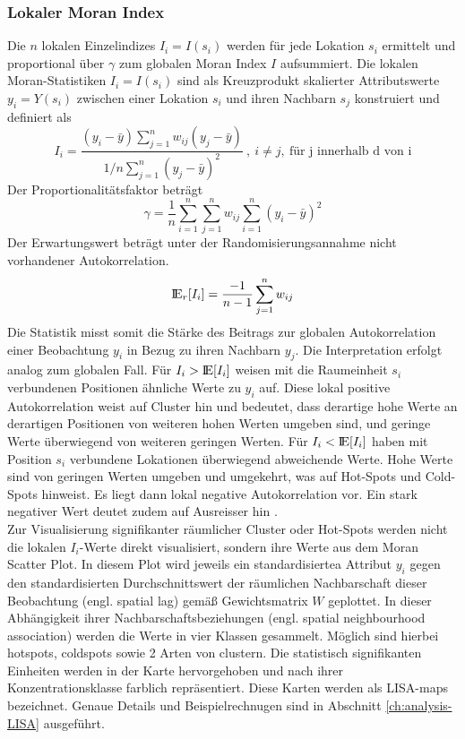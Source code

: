 \subsubsection{Lokaler Moran Index}
Die $n$ lokalen Einzelindizes $I_i=I(s_i)$ werden für jede Lokation $s_i$ ermittelt und proportional über $\gamma$ zum globalen Moran Index $I$ aufsummiert. 
Die lokalen Moran-Statistiken $I_i=I(s_i)$ sind als Kreuzprodukt skalierter Attributswerte $y_i=Y(s_i)$ zwischen 
einer Lokation $s_i$ und ihren Nachbarn $s_j$ konstruiert und definiert als
\begin{equation}
    I_i=\frac{\left(y_i-\bar{y}\right)\sum_{j=1}^{n}{w_{ij}\left(y_j-\bar{y}\right)}} {1 \big/ n \sum_{j=1}^{n} \left(y_j-\bar{y}\right)^2 } ~ , ~ i\neq j, ~ \text{für j innerhalb d von i} 
\end{equation}
Der Proportionalitätsfaktor beträgt
\begin{equation*}
    \gamma=\frac{1}{n} \sum_{i=1}^{n} \sum_{j=1}^{n} { w_{ij} \sum_{i=1}^{n} \left(y_i-\bar{y}\right)^2 }    
\end{equation*}
Der Erwartungswert beträgt unter der Randomisierungsannahme nicht vorhandener Autokorrelation.
\begin{equation*}
    {{\rm I\!E}_r}[I_i]= \frac{-1}{n-1} \sum_{j=1}^{n} w_{ij} 
\end{equation*}
Die Statistik misst somit die Stärke des Beitrags zur globalen Autokorrelation einer Beobachtung $y_i$ in Bezug zu ihren Nachbarn $y_j$. 
Die Interpretation erfolgt analog zum globalen Fall. 
Für $I_i > {\rm I\!E}[I_i]$ weisen mit die Raumeinheit $s_i$ verbundenen Positionen ähnliche Werte zu $y_i$ auf. 
Diese lokal positive Autokorrelation weist auf Cluster hin und bedeutet, dass derartige hohe Werte an derartigen Positionen von weiteren hohen Werten umgeben sind, 
und geringe Werte überwiegend von weiteren geringen Werten. 
Für $I_i< {\rm I\!E}[I_i]$ haben mit Position $s_i$ verbundene Lokationen überwiegend abweichende Werte. 
Hohe Werte sind von geringen Werten umgeben und umgekehrt, was auf Hot-Spots und Cold-Spots hinweist. 
Es liegt dann lokal negative Autokorrelation vor. 
Ein stark negativer Wert deutet zudem auf Ausreisser hin \cite[S. 24]{schabenberger_statistical_2005}.\\

Zur Visualisierung signifikanter räumlicher Cluster oder Hot-Spots werden nicht die lokalen $I_i$-Werte direkt visualisiert, sondern ihre Werte aus dem Moran Scatter Plot. 
In diesem Plot wird jeweils ein standardisiertea Attribut $y_i$ gegen den standardisierten Durchschnittswert der 
räumlichen Nachbarschaft dieser Beobachtung (engl. spatial lag) gemäß Gewichtsmatrix $W$ geplottet. 
In dieser Abhängigkeit ihrer Nachbarschaftsbeziehungen (engl. spatial neighbourhood association) werden die Werte in vier Klassen gesammelt. 
Möglich sind hierbei hotspots, coldspots sowie 2 Arten von clustern. 
Die statistisch signifikanten Einheiten werden in der Karte hervorgehoben und nach ihrer Konzentrationsklasse farblich repräsentiert. 
Diese Karten werden als LISA-maps bezeichnet. Genaue Details und Beispielrechnugen sind in Abschnitt \ref{ch:analysis-LISA} ausgeführt.

